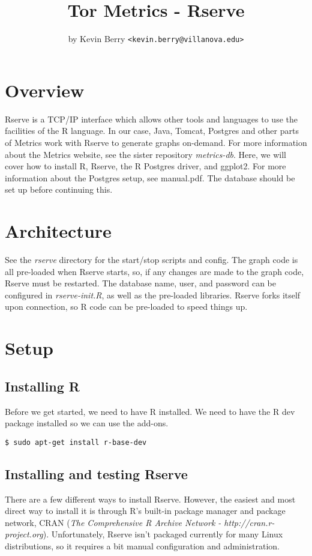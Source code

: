 \documentclass{article}
\begin{document}
\title{Tor Metrics - Rserve}
\author{by Kevin Berry \texttt{<kevin.berry@villanova.edu>}}
\maketitle
\section{Overview}
Rserve is a TCP/IP interface which allows other tools and languages to use
the facilities of the R language. In our case, Java, Tomcat, Postgres and
other parts of Metrics work with Rserve to generate graphs on-demand. For
more information about the Metrics website, see the sister repository
\emph{metrics-db}. Here, we will cover how to install R, Rserve, the R
Postgres driver, and ggplot2. For more information about the Postgres
setup, see manual.pdf. The database should be set up before continuing
this.

\section{Architecture}
See the \emph{rserve} directory for the start/stop scripts and
config. The graph code is all pre-loaded when Rserve starts, so, if any
changes are made to the graph code, Rserve must be restarted. The database
name, user, and password can be configured in \emph{rserve-init.R}, as well
as the pre-loaded libraries. Rserve forks itself upon connection, so R code
can be pre-loaded to speed things up.

\section{Setup}
\subsection{Installing R}
Before we get started, we need to have R installed. We need to have the R
dev package installed so we can use the add-ons.

\begin{verbatim}
$ sudo apt-get install r-base-dev
\end{verbatim}

\subsection{Installing and testing Rserve}
There are a few different ways to install Rserve. However, the easiest and
most direct way to install it is through R's built-in package manager and
package network, CRAN (\emph{The Comprehensive R Archive Network -
http://cran.r-project.org}). Unfortunately, Rserve isn't packaged currently
for many Linux distributions, so it requires a bit manual configuration and
administration.
\\
\end{document}
